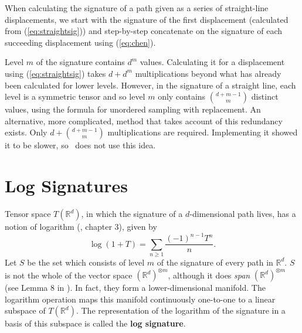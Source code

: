 When calculating the signature of a path given as a series of straight-line displacements, we start with the signature of the first displacement (calculated from (\ref{eq:straightsig})) and step-by-step concatenate on the signature of each succeeding displacement using (\ref{eq:chen}).

Level $m$ of the signature contains $d^m$ values. Calculating it for a displacement using (\ref{eq:straightsig}) takes $d+d^{m}$ multiplications beyond what has already been calculated for lower levels. However, in the signature of a straight line, each level is a symmetric tensor and so level $m$ only contains $\binom{d+m-1}{m}$ distinct values, using the formula for unordered sampling with replacement. An alternative, more complicated, method that takes account of this redundancy exists. Only $d+\binom{d+m-1}{m}$ multiplications are required. 
Implementing it showed it to be slower, so \ii\ does not use this idea.



\section{Log Signatures}\label{sec:logsigs}

Tensor space $T(\mathbb{R}^d)$, in which the signature of a $d$-dimensional path lives, has a notion of logarithm (\cite{FLA}, chapter 3), given by 
\begin{equation}\label{eq:log}
\log(1+T)=\sum_{n\ge1}\frac{(-1)^{n-1}T^n}{n}.
\end{equation}
Let $S$ be the set which consists of level $m$ of the signature of every path in $\mathbb{R}^d$.
$S$ is not the whole of the vector space $(\mathbb{R}^d)^{\otimes m}$, although it does \textit{span} $(\mathbb{R}^d)^{\otimes m}$
(see Lemma 8 in \cite{JD}). In fact, they form a lower-dimensional manifold. The 
logarithm operation %
maps this manifold continuously one-to-one to a linear subspace of $T(\mathbb{R}^d)$.
The representation of the logarithm of the signature in a basis of this subspace is called the \textbf{log signature}. %

